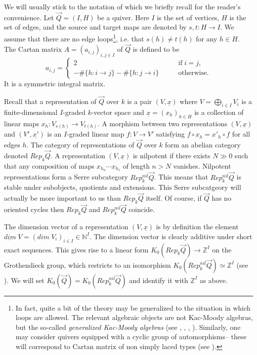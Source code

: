 \documentclass[a4paper,10pt]{amsart}
\def\Z{\mathbb{Z}}
\def\N{\mathbb{N}}
\numberwithin{equation}{section}
\begin{document}
We will usually stick to the notation of \cite[Lecture~3]{Trieste} which we briefly recall for the reader's convenience. Let $\vec{Q}=(I,H)$ be a quiver. Here $I$ is the set of vertices, $H$ is the set of edges, and the source and target maps are denoted by $s,t: H \to I$. We assume that there are no edge loops\footnote{In fact, quite a bit of the theory may  be generalized to the situation in which loops are allowed. The relevant algebraic objects are not Kac-Moody algebras, but the so-called \textit{generalized Kac-Moody algebras} (see \cite{SK}, \cite{SKK}, \cite{Lustight}, \cite{LZ}). Similarly, one may consider quivers equipped with a cyclic group of automorphisms-- these will correspond to Cartan matrix of non simply laced types (see \cite{Lusbook}). }, i.e. that $s(h) \neq t(h)$ for any $h \in H$.
 The Cartan matrix $A=(a_{i,j})_{i,j \in I}$ of $\vec{Q}$ is defined to be
$$a_{i,j}=\begin{cases} 2 & \qquad \text{if}\;i=j,\\
-\#\{h: i \to j\} -\#\{h: j \to i\} & \qquad \text{otherwise.}\end{cases}
$$
It is a symmetric integral matrix.

\vspace{.1in}

Recall that a representation of $\vec{Q}$ over $k$ is a pair $(V,\underline{x})$ where $V= \bigoplus_{i \in I} V_i$ is a finite-dimensional $I$-graded $k$-vector space and $\underline{x}=(x_h)_{h \in H}$ is a collection of linear maps $x_h: V_{s(h)} \to V_{t(h)}$. A morphism between two representations $(V,\underline{x})$ and $(V',\underline{x'})$ is an $I$-graded linear map $f: V \to V'$ satisfying $f \circ x_h=x'_h \circ f$ for all edges $h$.
The category of representations of $\vec{Q}$ over $k$ form an abelian category denoted $Rep_k\vec{Q}$. A representation $(V, \underline{x})$ is nilpotent if there exists $N \gg 0$ such that any composition of maps $x_{h_n} \cdots x_{h_1}$ of length $n >N$ vanishes. Nilpotent representations form a Serre subcategory $Rep^{nil}_k\vec{Q}$. This means that $Rep^{nil}_k\vec{Q}$ is stable under subobjects, quotients and extensions. This Serre subcatgeory will actually be more important to us than $Rep_k\vec{Q}$ itself. Of course, if $\vec{Q}$ has no oriented cycles then $Rep_k\vec{Q}$ and $Rep^{nil}_k\vec{Q}$ coincide.

\vspace{.15in}

The dimension vector of a representation $(V,\underline{x})$ is by definition the element $\underline{dim}\;V=({dim}\;V_i)_{i \in I} \in \N^I$. The dimension vector is clearly additive under short exact sequences. This gives rise to a linear form $K_0(Rep_{{k}}\vec{Q}) \to \Z^I$ on the Grothendieck group, which restricts to an isomorphism $K_0(Rep^{nil}_{k}\vec{Q}) \simeq \Z^I$ (see \cite[Cor. 3.2.]{Trieste} ). We will set $K_0(\vec{Q})=K_0(Rep^{nil}_{{k}}\vec{Q})$ and identify it with $\Z^I$ as above.
\end{document}
